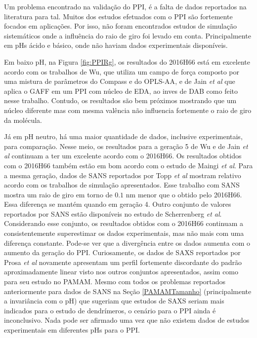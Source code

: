 Um problema encontrado na validação do PPI, é a falta de dados reportados na literatura para tal. Muitos dos estudos efetuados com o PPI são fortemente focados em aplicações.
Por isso, não foram encontrados estudos de simulação sistemáticos onde a influência do raio de giro foi levado em conta.
Principalmente em pHs ácido e básico, onde não haviam dados experimentais disponíveis.

Em baixo pH, na Figura \ref{fig:PPIRg}, os resultados do 2016H66\cite{Horta2016} está em excelente acordo com os trabalhos de Wu\cite{Wu2010}, que utiliza um campo de força composto por uma mistura de parâmetros do Compass\cite{Sun1998} e do OPLS-AA\cite{Jorgensen1996}, e de Jain \textit{et al}\cite{Jain2013} que aplica o GAFF\cite{Wang2004} em um PPI com núcleo de EDA, ao inves de DAB como feito nesse trabalho.
Contudo, os resultados são bem próximos mostrando que um núcleo diferente mas com mesma valência não influencia fortemente o raio de giro da molécula.

Já em pH neutro, há uma maior quantidade de dados, inclusive experimentais, para comparação.
Nesse meio, os resultados para a geração 5 de Wu\cite{Wu2010} e de Jain \textit{et al}\cite{Jain2013} continuam a ter um excelente acordo com o 2016H66\cite{Horta2016}. 
Os resultados obtidos com o 2016H66\cite{Horta2016} também estão em bom acordo com o estudo de Maingi \textit{et al}\cite{Maingi2012}.
Para a mesma geração, dados de SANS reportados por Topp \textit{et al}\cite{Topp1999} mostram relativo acordo com os trabalhos de simulação apresentados.
Esse trabalho com SANS mostra um raio de giro em torno de $0.1$ nm menor que o obtido pelo 2016H66\cite{Horta2016}.
Essa diferença se mantém quando em geração 4.
Outro conjunto de valores reportados por SANS estão disponíveis no estudo de Scherrenberg \textit{et al}\cite{Scherrenberg1998}.
Considerando esse conjunto, os resultados obtidos com o 2016H66\cite{Horta2016} continuam a consistentemente superestimar os dados experimentais, mas não mais com uma diferença constante.
Pode-se ver que a divergência entre os dados aumenta com o aumento da geração do PPI.
Curiosamente, os dados de SAXS reportados por Prosa \textit{et al}\cite{Prosa1997} novamente apresentam um perfil fortemente discordante do padrão aproximadamente linear visto nos outros conjuntos apresentados, assim como para seu estudo no PAMAM.
Mesmo com todos os problemas reportados anteriormente para dados de SANS\cite{Porcar2008} na Seção \ref{PAMAMTamanho} (principalmente a invariância com o pH) que sugeriam que estudos de SAXS\cite{Rathgeber2002} seriam mais indicados para o estudo de dendrímeros, o cenário para o PPI ainda é inconclusivo.
Nada pode ser afirmado uma vez que não existem dados de estudos experimentais em diferentes pHs para o PPI.

